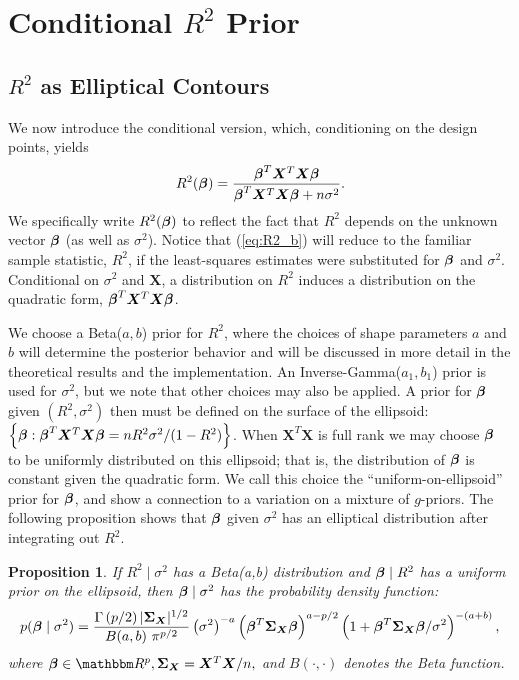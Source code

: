 \documentclass[12pt]{article}
\newtheorem{proposition}{Proposition}
\newcommand{\X}{{\bm  X}}
\newcommand{\Xbf}{{\bm   X}}
\newcommand{\Sigmabf}{{\mathbf \Sigma}}
\newcommand{\greekbold}[1]{\mbox{\boldmath $#1$}}
\newcommand{\betabf}{\greekbold{\beta}}
\newcommand{\R}{{R^2}}
\begin{document}
\section{Conditional $\R$ Prior} \label{section:conditional prior}
\subsection{$R^2$ as Elliptical Contours}

We now introduce the conditional version, which, conditioning on the design points, yields
\begin{equation} \label{eq:R2_b}
R^2(\betabf) = \frac{\betabf^T \Xbf^T\Xbf \betabf}{\betabf^T \Xbf^T\Xbf \betabf + n\sigma^2}.
\end{equation}
We specifically write $\R(\betabf)$ to reflect the fact that $\R$ depends on the unknown vector $\betabf$ (as well as $\sigma^2$).
Notice that (\ref{eq:R2_b}) will reduce to the familiar sample statistic, $R^2$, if the least-squares estimates were substituted for $\betabf$ and $\sigma^2$.
Conditional on $\sigma^2$ and $\Xbf$, a distribution on $R^2$ induces a distribution on the quadratic form, $\betabf^T\Xbf^T\Xbf\betabf$.




We choose a Beta($a,b$) prior for $R^2$, where the choices of shape parameters $a$ and $b$ will  determine the posterior behavior and will be discussed in more detail in the theoretical results and the implementation.
An Inverse-Gamma($a_1, b_1$) prior is used for $\sigma^2$, but we note that other choices may also  be  applied.
A prior for $\betabf$ given $(R^2, \sigma^2)$ then must be defined on the surface of the ellipsoid: $\left\{ \betabf: \betabf^T\X^T\X\betabf = {n R^2 \sigma^2}/({1-R^2}) \right\}$.
When $\X^T\X$ is full rank we may choose $\betabf$ to be uniformly distributed on this ellipsoid;
that is, the distribution of $\betabf$ is constant given the quadratic form. %
We call this choice the ``uniform-on-ellipsoid'' prior for $\betabf$, and show a connection to a variation on a mixture of $g$-priors.
The following proposition shows that $\betabf$ given $\sigma^2$ has an elliptical distribution after integrating out $\R$.

\begin{proposition}\label{prop1}
    If $R^2 \mid \sigma^2$ has a Beta(a,b) distribution and $\betabf\mid R^2$ has a uniform prior on the ellipsoid, then $\betabf\mid \sigma^2$ has the probability density function:
\begin{equation}
    \label{eq:priorbetabf}
    p(\betabf \mid \sigma^2) = \frac{\Gamma\left( p/2\right)|\Sigmabf_\X|^{1/2} }{B(a,b)~\pi^{p/2}} \left( \sigma^2 \right)^{-a} \left( \betabf^T \Sigmabf_\X \betabf \right)^{a-p/2} \left(1 + \betabf^T \Sigmabf_\X \betabf /\sigma^2\right)^{-(a+b)},
\end{equation}
where $\betabf \in \mathbbm R^p, \Sigmabf_\X = \X^T\X/n, $ and $B(\cdot, \cdot)$ denotes the Beta function.
\end{proposition}
\end{document}
